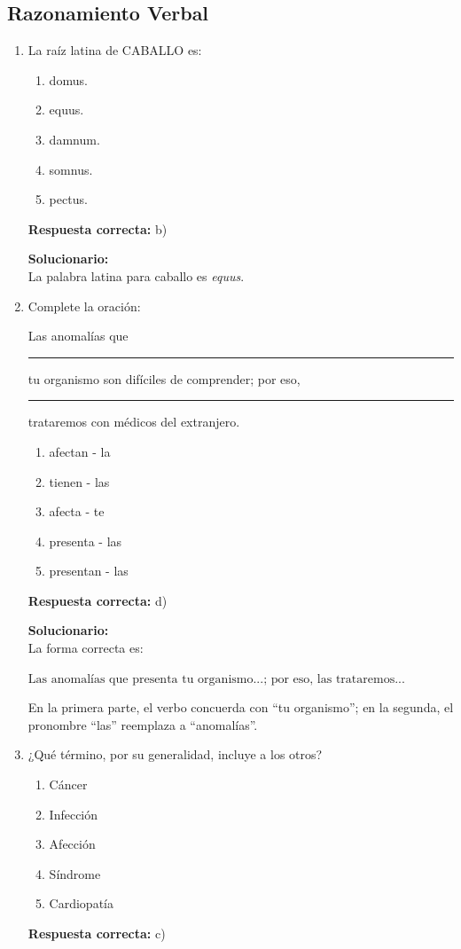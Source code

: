 \subsection*{Razonamiento Verbal}

\begin{enumerate}
	
	\item La raíz latina de CABALLO es:
	\begin{enumerate}[label=\alph*)]
		\item domus.
		\item equus.
		\item damnum.
		\item somnus.
		\item pectus.
	\end{enumerate}
	\textbf{Respuesta correcta:} b)
	
	\vspace{2mm}
	\textbf{Solucionario:}\\
	La palabra latina para caballo es \textit{equus}.
	
	\vspace{6mm}
	
	\item Complete la oración:
	
	Las anomalías que \rule{2cm}{0.15mm} tu organismo son difíciles de comprender; por eso, \rule{2cm}{0.15mm} trataremos con médicos del extranjero.
	\begin{enumerate}[label=\alph*)]
		\item afectan - la
		\item tienen - las
		\item afecta - te
		\item presenta - las
		\item presentan - las
	\end{enumerate}
	\textbf{Respuesta correcta:} d)
	
	\vspace{2mm}
	\textbf{Solucionario:}\\
	La forma correcta es:
	
	$\text{Las anomalías que presenta tu organismo...; por eso, las trataremos...}$
	
	En la primera parte, el verbo concuerda con “tu organismo”; en la segunda, el pronombre “las” reemplaza a “anomalías”.
	
	\vspace{6mm}
	
	\item ¿Qué término, por su generalidad, incluye a los otros?
	\begin{enumerate}[label=\alph*)]
		\item Cáncer
		\item Infección
		\item Afección
		\item Síndrome
		\item Cardiopatía
	\end{enumerate}
	\textbf{Respuesta correcta:} c)
	

\end{enumerate}
